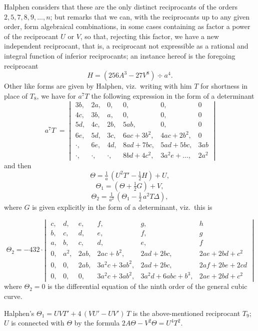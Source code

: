 \documentclass[11pt]{article}
\begin{document}
Halphen considers that these are the only distinct reciprocants of the orders $2, 5, 7, 8, 9, \ldots, n$; but remarks that we can, with the reciprocants up to any given order, form algebraical combinations, in some cases containing as factor a power of the reciprocant $U$ or $V$, so that, rejecting this factor, we have a new independent reciprocant, that is, a reciprocant not expressible as a rational and integral function of inferior reciprocants; an instance hereof is the foregoing reciprocant
\[
H = (256 A^3 - 27 V^8) \div a^4.
\]
Other like forms are given by Halphen, viz.\ writing with him $T$ for shortness in place of $T_8$, we have for $a^7 T$ the following expression in the form of a determinant
\[
a^7 T \;=\; \left|\;\begin{array}{cccccc}
3 b, & 2 a, & 0, & 0, & 0, & 0 \\
4 c, & 3 b, & a, & 0, & 0, & 0 \\
5 d, & 4 c, & 2 b, & 5 a b, & 0, & 0 \\
6 e, & 5 d, & 3 c, & 6 a c + 3 b^2, & 4 a c + 2 b^2, & 0 \\
\cdot, & 6 e, & 4 d, & 8 a d + 7 b c, & 5 a d + 5 b c, & 3 a b \\
\cdot, & \cdot, & \cdot, & 8 b d + 4 c^2, & 3 a^2 e + \ldots, & 2 a^2
\end{array}\;\right|
\]
and then
\[
\Theta = \tfrac{1}{a}\,(U^2 T' - \tfrac{1}{2} H) + U,
\]
\[
\Theta_1 = (\Theta + \tfrac{1}{2} G) + V,
\]
\[
\Theta_2 = \tfrac{1}{a^2}\,(\Theta_1 - \tfrac{1}{2}\,a^2 T \Delta),
\]
where $G$ is given explicitly in the form of a determinant, viz.\ this is

\[
\Theta_2 = -432 \cdot \left|\;\begin{array}{cccccc}
c, & d, & e, & f, & g, & h \\
b, & c, & d, & e, & f, & g \\
a, & b, & c, & d, & e, & f \\
0, & a^2, & 2 a b, & 2 a c + b^2, & 2 a d + 2 b c, & 2 a e + 2 b d + c^2 \\
0, & 0, & 2 a b, & 3 a^2 c + 3 a b^2, & 2 a d + 2 b c, & 2 a f + 2 b e + 2 c d \\
0, & 0, & 0, & 3 a^2 c + 3 a b^2, & 3 a^2 d + 6 a b c + b^3, & 2 a e + 2 b d + c^2
\end{array}\;\right|
\]
where $\Theta_2 = 0$ is the differential equation of the ninth order of the general cubic curve.

Halphen's $\Theta_1 = U V T' + 4\,(V U' - U V')\,T$ is the above-mentioned reciprocant $T_9$; $U$ is connected with $\Theta$ by the formula $2 A \Theta - V^2 \Theta = U^4 T^2$.
\end{document}
